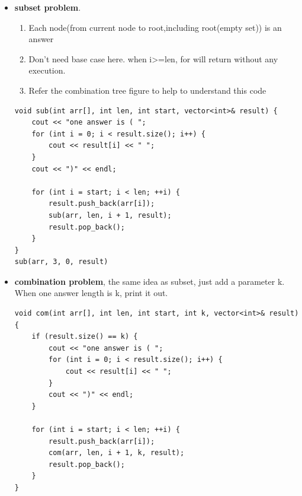 \documentclass[a4paper,11pt,twoside]{book}
\begin{document}
\begin{itemize}
\begin{itemize}
\end{itemize}

	\item \textbf{subset problem}. 
\begin{enumerate}
	\item Each node(from current node to root,including root(empty set)) is an answer
	\item Don't need base case here.  when i>=len, for will return without any execution.
	\item Refer the combination tree figure to help to understand this code
\end{enumerate}
	
\begin{lstlisting}
void sub(int arr[], int len, int start, vector<int>& result) {
	cout << "one answer is ( ";
	for (int i = 0; i < result.size(); i++) {
		cout << result[i] << " ";
	}
	cout << ")" << endl;
	
	for (int i = start; i < len; ++i) {
		result.push_back(arr[i]);  
		sub(arr, len, i + 1, result);
		result.pop_back();
	}
}
sub(arr, 3, 0, result)
\end{lstlisting}
	
	\item \textbf{combination problem}, the same idea as subset, just add a parameter k. When one answer length is k, print it out. 
\begin{lstlisting}
void com(int arr[], int len, int start, int k, vector<int>& result){
	if (result.size() == k) {
		cout << "one answer is ( ";
		for (int i = 0; i < result.size(); i++) {
			cout << result[i] << " ";
		}
		cout << ")" << endl;
	}
	
	for (int i = start; i < len; ++i) {
		result.push_back(arr[i]);  
		com(arr, len, i + 1, k, result);
		result.pop_back();
	}
}	
\end{lstlisting}


\end{itemize}
\end{document}
